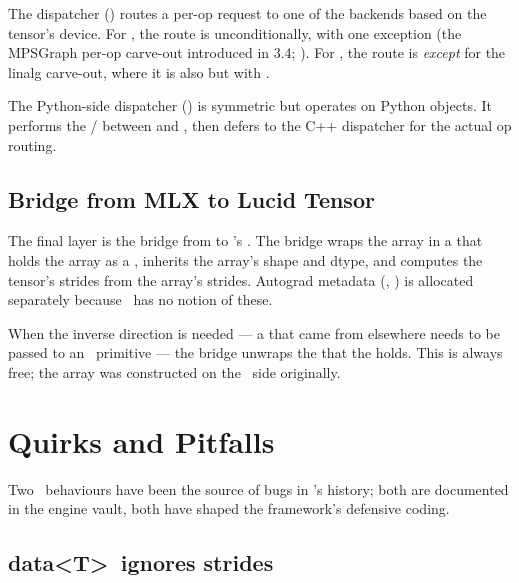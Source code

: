 The dispatcher () routes a per-op request
to one of the backends based on the tensor's device. For
, the route is  unconditionally,
with one exception (the MPSGraph per-op carve-out introduced in 3.4;
). For , the route is
 \emph{except} for the linalg carve-out,
where it is also  but with .

The Python-side dispatcher () is symmetric
but operates on Python  objects. It performs the
 /  between  and
, then defers to the C++ dispatcher for the actual
op routing.

\subsection{Bridge from MLX to Lucid Tensor}
\label{ssec:mlx_runtime:bridge}

The final layer is the bridge from  to
\Lucid's . The bridge wraps the array in a
 that holds the array as a ,
inherits the array's shape and dtype, and computes the tensor's
strides from the array's strides. Autograd metadata
(, ) is allocated separately
because \MLX\ has no notion of these.

When the inverse direction is needed --- a  that
came from elsewhere needs to be passed to an \MLX\ primitive ---
the bridge unwraps the  that the
 holds. This is always free; the array was
constructed on the \MLX\ side originally.

\section{Quirks and Pitfalls}
\label{sec:mlx_runtime:quirks}

Two \MLX\ behaviours have been the source of bugs in \Lucid's
history; both are documented in the engine vault, both have shaped
the framework's defensive coding.

\subsection{data\textless T\textgreater\ ignores strides}
\label{ssec:mlx_runtime:data_strides}

